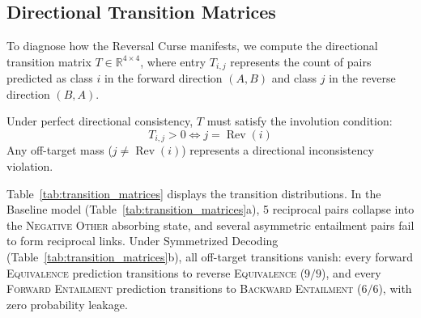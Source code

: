 \documentclass[11pt,a4paper,twocolumn]{article}
\begin{document}
\subsection{Directional Transition Matrices}
To diagnose how the Reversal Curse manifests, we compute the directional transition matrix $T \in \mathbb{R}^{4 \times 4}$, where entry $T_{i, j}$ represents the count of pairs predicted as class $i$ in the forward direction $(A, B)$ and class $j$ in the reverse direction $(B, A)$. 

Under perfect directional consistency, $T$ must satisfy the involution condition:
\begin{equation}
T_{i, j} > 0 \iff j = \operatorname{Rev}(i)
\end{equation}
Any off-target mass ($j \ne \operatorname{Rev}(i)$) represents a directional inconsistency violation.

Table~\ref{tab:transition_matrices} displays the transition distributions. In the Baseline model (Table~\ref{tab:transition_matrices}a), 5 reciprocal pairs collapse into the \textsc{Negative Other} absorbing state, and several asymmetric entailment pairs fail to form reciprocal links. Under Symmetrized Decoding (Table~\ref{tab:transition_matrices}b), all off-target transitions vanish: every forward \textsc{Equivalence} prediction transitions to reverse \textsc{Equivalence} ($9/9$), and every \textsc{Forward Entailment} prediction transitions to \textsc{Backward Entailment} ($6/6$), with zero probability leakage.
\end{document}
